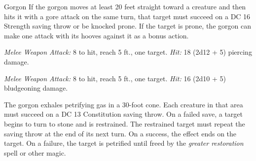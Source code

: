 \documentclass[10pt,a4paper,twoside,bg=print,twocolumn,openany,nodeprecatedcode]{dndbook}
\begin{document}
\begin{DndMonster}[float=t]{Gorgon}
\DndMonsterBasics[
armor-class = {19 (natural armor)},
hit-points = {\DndDice{12d10 + 48}},
speed = {40 ft.}
]
\DndMonsterAbilityScores[
 str = 20,
 dex = 11,
 con = 18,
 int = 2,
 wis = 12,
 cha = 7
]
\DndMonsterDetails[
skills = {Perception +4},
condition-immunities = {petrified},
senses = {darkvision 60 ft., passive perception 14},
challenge = 5,
]
If the gorgon moves at least 20 feet straight toward a creature and then hits it with a gore attack on the same turn, that target must succeed on a DC 16 Strength saving throw or be knocked prone. If the target is prone, the gorgon can make one attack with its hooves against it as a bonus action.

\textsl{Melee Weapon Attack:} 8 to hit, reach 5 ft., one target. \textsl{Hit:} 18 (2d12 + 5) piercing damage.

\textsl{Melee Weapon Attack:} 8 to hit, reach 5 ft., one target. \textsl{Hit:} 16 (2d10 + 5) bludgeoning damage.

The gorgon exhales petrifying gas in a 30-foot cone. Each creature in that area must succeed on a DC 13 Constitution saving throw. On a failed save, a target begins to turn to stone and is restrained. The restrained target must repeat the saving throw at the end of its next turn. On a success, the effect ends on the target. On a failure, the target is petrified until freed by the  \textit{greater restoration} spell or other magic.

\end{DndMonster}
\end{document}
